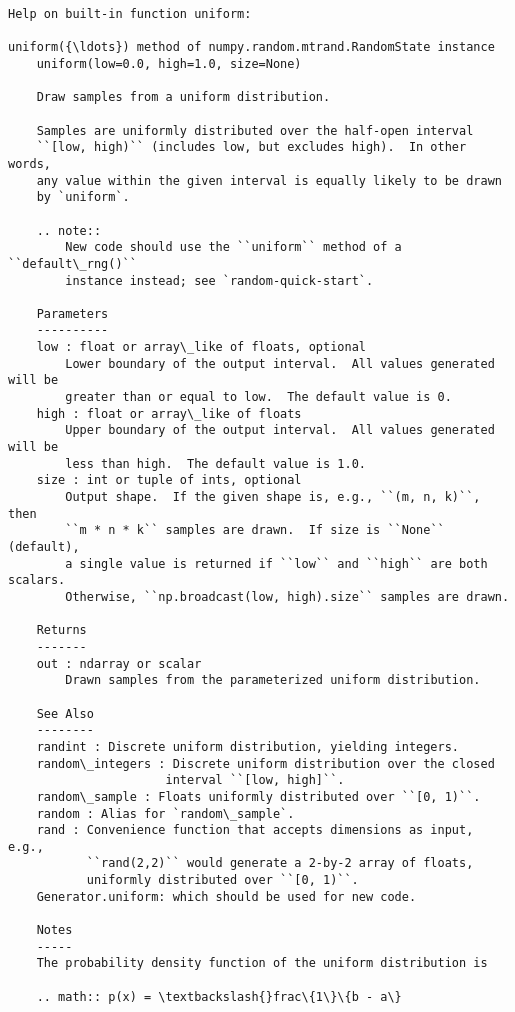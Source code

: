 \documentclass[11pt]{article}
\begin{document}
    \begin{Verbatim}[commandchars=\\\{\}]
Help on built-in function uniform:

uniform({\ldots}) method of numpy.random.mtrand.RandomState instance
    uniform(low=0.0, high=1.0, size=None)

    Draw samples from a uniform distribution.

    Samples are uniformly distributed over the half-open interval
    ``[low, high)`` (includes low, but excludes high).  In other words,
    any value within the given interval is equally likely to be drawn
    by `uniform`.

    .. note::
        New code should use the ``uniform`` method of a ``default\_rng()``
        instance instead; see `random-quick-start`.

    Parameters
    ----------
    low : float or array\_like of floats, optional
        Lower boundary of the output interval.  All values generated will be
        greater than or equal to low.  The default value is 0.
    high : float or array\_like of floats
        Upper boundary of the output interval.  All values generated will be
        less than high.  The default value is 1.0.
    size : int or tuple of ints, optional
        Output shape.  If the given shape is, e.g., ``(m, n, k)``, then
        ``m * n * k`` samples are drawn.  If size is ``None`` (default),
        a single value is returned if ``low`` and ``high`` are both scalars.
        Otherwise, ``np.broadcast(low, high).size`` samples are drawn.

    Returns
    -------
    out : ndarray or scalar
        Drawn samples from the parameterized uniform distribution.

    See Also
    --------
    randint : Discrete uniform distribution, yielding integers.
    random\_integers : Discrete uniform distribution over the closed
                      interval ``[low, high]``.
    random\_sample : Floats uniformly distributed over ``[0, 1)``.
    random : Alias for `random\_sample`.
    rand : Convenience function that accepts dimensions as input, e.g.,
           ``rand(2,2)`` would generate a 2-by-2 array of floats,
           uniformly distributed over ``[0, 1)``.
    Generator.uniform: which should be used for new code.

    Notes
    -----
    The probability density function of the uniform distribution is

    .. math:: p(x) = \textbackslash{}frac\{1\}\{b - a\}


\end{Verbatim}
\end{document}
